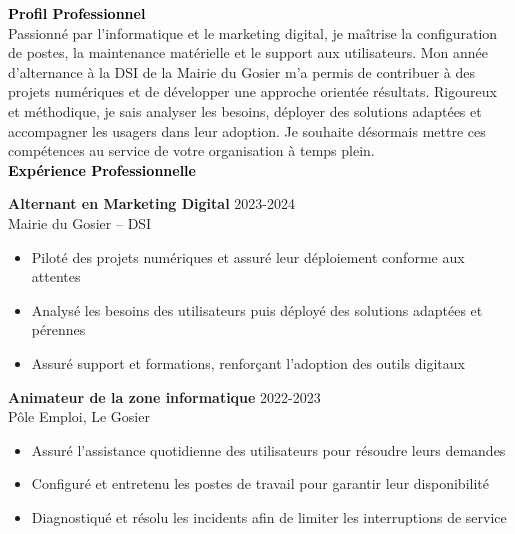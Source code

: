\documentclass{article}
\begin{document}
\begin{paracol}{2}
\switchcolumn
\color{black}

\textcolor{black}{\Large \textbf{Profil Professionnel}} \\[2pt]
Passionné par l’informatique et le marketing digital, je maîtrise la configuration de postes, la maintenance matérielle et le support aux utilisateurs. Mon année d’alternance à la DSI de la Mairie du Gosier m’a permis de contribuer à des projets numériques et de développer une approche orientée résultats. Rigoureux et méthodique, je sais analyser les besoins, déployer des solutions adaptées et accompagner les usagers dans leur adoption. Je souhaite désormais mettre ces compétences au service de votre organisation à temps plein. \\[8pt]

\textcolor{black}{\Large \textbf{Expérience Professionnelle}} \\[2pt]

\colorbox{maincolor}{%
  \begin{minipage}{\linewidth}
    \textbf{Alternant en Marketing Digital}   2023-2024  \\ Mairie du Gosier – DSI 
    \begin{itemize}
      \item Piloté des projets numériques et assuré leur déploiement conforme aux attentes \item Analysé les besoins des utilisateurs puis déployé des solutions adaptées et pérennes \item Assuré support et formations, renforçant l’adoption des outils digitaux
    \end{itemize}
  \end{minipage}}

\vspace{3mm}


\colorbox{maincolor}{%
  \begin{minipage}{\linewidth}
    \textbf{Animateur de la zone informatique}   2022-2023  \\ Pôle Emploi, Le Gosier 
    \begin{itemize}
      \item Assuré l’assistance quotidienne des utilisateurs pour résoudre leurs demandes \item Configuré et entretenu les postes de travail pour garantir leur disponibilité \item Diagnostiqué et résolu les incidents afin de limiter les interruptions de service
    \end{itemize}
  \end{minipage}}


\end{paracol}
\end{document}
